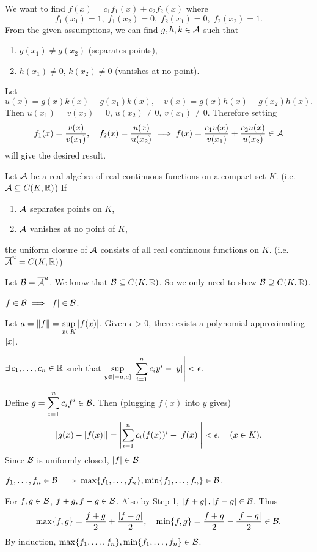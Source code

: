 \pf We want to find \(f(x) = c_1f_1(x) + c_2f_2(x)\) where
\[
    f_1(x_1) = 1,\; f_1(x_2) = 0,\; f_2(x_1) = 0,\; f_2(x_2) = 1.
\]
From the given assumptions, we can find \(g, h, k \in \mathcal{A}\) such that
\begin{enumerate}
    \item \(g(x_1) \neq g(x_2)\) (separates points),
    \item \(h(x_1)\neq 0\), \(k(x_2) \neq 0\) (vanishes at no point).
\end{enumerate}
Let
\[
    u(x) = g(x)k(x) - g(x_1)k(x), \quad v(x) = g(x)h(x) - g(x_2)h(x).
\]
Then \(u(x_1) = v(x_2) = 0\), \(u(x_2) \neq 0\), \(v(x_1) \neq 0\). Therefore setting
\[
    f_1(x) = \frac{v(x)}{v(x_1)}, \quad f_2(x) = \frac{u(x)}{u(x_2)} \implies f(x) = \frac{c_1v(x)}{v(x_1)} + \frac{c_2u(x)}{u(x_2)} \in \mathcal{A}
\]
will give the desired result.

  Let \(\mathcal{A}\) be a real algebra of real continuous functions on a compact set \(K\). (i.e. \(\mathcal{A} \subseteq C(K, \mathbb{R})\)) If
\begin{enumerate}
    \item \(\mathcal{A}\) separates points on \(K\),
    \item \(\mathcal{A}\) vanishes at no point of \(K\),
\end{enumerate}
the uniform closure of \(\mathcal{A}\) consists of all real continuous functions on \(K\). (i.e. \(\overline{\mathcal{A}}^u = C(K, \mathbb{R})\))

\pf Let \(\mathcal{B} = \overline{\mathcal{A}}^u\). We know that \(\mathcal{B} \subseteq C(K, \mathbb{R})\). So we only need to show \(\mathcal{B} \supseteq C(K, \mathbb{R})\).

 \(f \in \mathcal{B} \implies \left| f \right| \in \mathcal{B}\).

Let \(a = \left\lVert f \right\rVert = \displaystyle \sup_{x \in K} \left| f(x) \right|\). Given \(\epsilon > 0\), there exists a polynomial approximating \(\left| x \right|\).
\begin{center}
    \(\exists c_1, \dots, c_n \in \R\) such that \(\displaystyle \sup_{y \in [-a, a]} \left| \sum_{i=1}^n c_i y^i - \left| y \right| \right| < \epsilon\).
\end{center}
Define \(g = \displaystyle\sum_{i=1}^n c_i f^i \in \mathcal{B}\). Then (plugging \(f(x)\) into \(y\) gives)
\[
    \left| g(x) - \left| f(x) \right| \right| = \left| \sum_{i=1}^n c_i (f(x))^i - \left| f(x) \right| \right| < \epsilon, \quad (x\in K).
\]
Since \(\mathcal{B}\) is uniformly closed, \(\left| f \right| \in \mathcal{B}\).

 \(f_1, \dots, f_n \in \mathcal{B} \implies \max\{f_1, \dots, f_n\}, \min\{f_1, \dots, f_n\} \in \mathcal{B}\).

For \(f, g \in \mathcal{B}\), \(f + g, f - g \in \mathcal{B}\). Also by Step 1, \(\left| f+g \right|, \left| f-g \right| \in \mathcal{B}\). Thus
\[
    \max\{f, g\} = \frac{f+g}{2} + \frac{\left| f-g \right|}{2}, \quad \min\{f, g\} = \frac{f + g}{2} - \frac{\left| f-g \right|}{2} \in \mathcal{B}.
\]
By induction, \(\max\{f_1, \dots, f_n\}, \min\{f_1, \dots, f_n\} \in \mathcal{B}\).

\pagebreak
